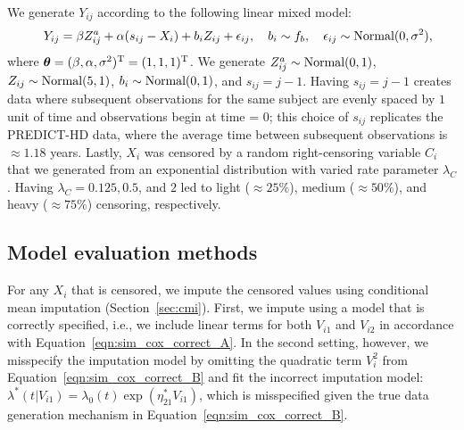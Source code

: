 \documentclass[12pt]{article}
\def\Normal{\hbox{Normal}}
\def\bse{\begin{eqnarray*}}
\def\ese{\end{eqnarray*}}
\def\bse{\begin{eqnarray*}}
\def\ese{\end{eqnarray*}}
\def\trans{^{\rm T}}
\def\btheta{{\boldsymbol{\theta}}}
\begin{document}
We generate $Y_{ij}$ according to the following linear mixed model:
\bse
&&Y_{ij} =
\beta Z^a_{ij} + \alpha(s_{ij}-X_i) + b_iZ_{ij} + \epsilon_{ij}, \ \ \
b_i\sim f_b, \ \ \ \epsilon_{ij}\sim\Normal(0,\sigma^2), \nonumber
\ese
where $\btheta=(\beta,\alpha,\sigma^2)\trans=(1,1,1)\trans$. We generate $Z^a_{ij}\sim\Normal(0,1)$, $Z_{ij}\sim\Normal(5,1)$,  
$b_i\sim\Normal(0,1)$, and $s_{ij}=j-1$. Having $s_{ij}=j-1$ creates data where subsequent observations for the same subject are evenly spaced by $1$ unit of time and observations begin at time = $0$; this choice of $s_{ij}$ replicates the PREDICT-HD data, where the average time between subsequent observations is $\approx 1.18$ years. Lastly, $X_i$ was censored by a random right-censoring variable $C_i$ that we generated from an exponential distribution with varied rate parameter $\lambda_C$. Having $\lambda_C=0.125,0.5$, and $2$ led to light ($\approx 25\%$), medium ($\approx 50\%$), and heavy ($\approx 75\%$) censoring, respectively. %


\subsection{Model evaluation methods}
\label{sec:model_eval}

For any $X_i$ that is censored, we impute the censored values using conditional mean imputation (Section~\ref{sec:cmi}). First, we impute using a model that is correctly specified, i.e., we include linear terms for both $V_{i1}$ and $V_{i2}$ in accordance with Equation~\eqref{eqn:sim_cox_correct_A}. In the second setting, however, we misspecify the imputation model by omitting the quadratic term $V_{i}^2$ from Equation~\eqref{eqn:sim_cox_correct_B} and fit the incorrect imputation model:
$\lambda^*(t|V_{i1})=\lambda_0(t)\exp(\eta_{21}^*V_{i1})$,
which is misspecified given the true data generation mechanism in Equation~\eqref{eqn:sim_cox_correct_B}. 
\end{document}
